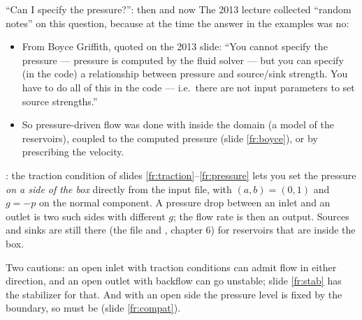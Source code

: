 \documentclass[aspectratio=169,11pt]{beamer}
\begin{document}
\begin{frame}{``Can I specify the pressure?'': then and now}
\label{fr:pressureq}
\small The 2013 lecture collected ``random notes'' on this question, because at the time the answer in the examples was no:
\begin{itemize}
  \item From Boyce Griffith, quoted on the 2013 slide: ``You cannot specify the pressure --- pressure is computed by the fluid solver --- but you can specify (in the code) a relationship between pressure and source/sink strength. You have to do all of this in the code --- i.e.\ there are not input parameters to set source strengths.''
  \item So pressure-driven flow was done with  inside the domain (a model of the reservoirs), coupled to the computed pressure (slide \ref{fr:boyce}), or by prescribing the velocity.
\end{itemize}
\vspace{1mm}
\begin{punchbox}
\small {}: the traction condition of slides \ref{fr:traction}--\ref{fr:pressure} lets you set the pressure \emph{on a side of the box} directly from the input file, with $(a, b) = (0, 1)$ and $g = -p$ on the normal component. A pressure drop between an inlet and an outlet is two such sides with different $g$; the flow rate is then an output. Sources and sinks are still there (the  file and , chapter 6) for reservoirs that are inside the box.
\end{punchbox}
\vspace{1mm}
\small Two cautions: an open inlet with traction conditions can admit flow in either direction, and an open outlet with backflow can go unstable; slide \ref{fr:stab} has the stabilizer for that. And with an open side the pressure level is fixed by the boundary, so  must be  (slide \ref{fr:compat}).
\end{frame}
\end{document}
